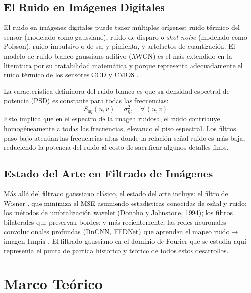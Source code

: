 \documentclass[conference]{IEEEtran}
\begin{document}
\subsection{El Ruido en Imágenes Digitales}

El ruido en imágenes digitales puede tener múltiples orígenes: ruido
térmico del sensor (modelado como gaussiano), ruido de disparo o \textit{shot
noise} (modelado como Poisson), ruido impulsivo o de sal y pimienta, y
artefactos de cuantización. El modelo de ruido blanco gaussiano aditivo
(AWGN) es el más extendido en la literatura por su tratabilidad matemática
y porque representa adecuadamente el ruido térmico de los sensores CCD y
CMOS \cite{oppenheim1999}.

La característica definidora del ruido blanco es que su densidad espectral
de potencia (PSD) es constante para todas las frecuencias:
\begin{equation}
  S_{\eta\eta}(u,v) = \sigma_\eta^2, \quad \forall\,(u,v)
  \label{eq:psd_ruido}
\end{equation}
Esto implica que en el espectro de la imagen ruidosa, el ruido contribuye
homogéneamente a todas las frecuencias, elevando el piso espectral. Los
filtros paso-bajo atenúan las frecuencias altas donde la relación
señal-ruido es más baja, reduciendo la potencia del ruido al costo de
sacrificar algunos detalles finos.

\subsection{Estado del Arte en Filtrado de Imágenes}

Más allá del filtrado gaussiano clásico, el estado del arte incluye:
el filtro de Wiener \cite{oppenheim1999}, que minimiza el MSE asumiendo
estadísticas conocidas de señal y ruido; los métodos de umbralización
wavelet (Donoho y Johnstone, 1994); los filtros bilaterales que preservan
bordes; y más recientemente, las redes neuronales convolucionales profundas
(DnCNN, FFDNet) que aprenden el mapeo ruido$\to$imagen limpia
\cite{gonzalez2018}. El filtrado gaussiano en el dominio de Fourier que
se estudia aquí representa el punto de partida histórico y teórico de todos
estos desarrollos.

\section{Marco Teórico}
\label{sec:marco}
\end{document}
